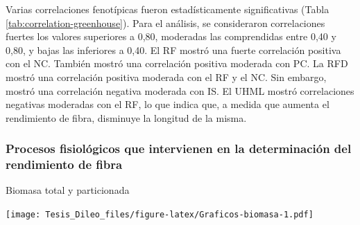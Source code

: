 \documentclass[12pt,oneside]{reedthesis}
\begin{document}
Varias correlaciones fenotípicas fueron estadísticamente significativas (Tabla \ref{tab:correlation-greenhouse}). Para el análisis, se consideraron correlaciones fuertes los valores superiores a 0,80, moderadas las comprendidas entre 0,40 y 0,80, y bajas las inferiores a 0,40. El RF mostró una fuerte correlación positiva con el NC. También mostró una correlación positiva moderada con PC. La RFD mostró una correlación positiva moderada con el RF y el NC. Sin embargo, mostró una correlación negativa moderada con IS. El UHML mostró correlaciones negativas moderadas con el RF, lo que indica que, a medida que aumenta el rendimiento de fibra, disminuye la longitud de la misma.

\subsubsection{Procesos fisiológicos que intervienen en la determinación del rendimiento de fibra}\label{procesos-fisioluxf3gicos-que-intervienen-en-la-determinaciuxf3n-del-rendimiento-de-fibra}

Biomasa total y particionada

\texttt{[image: Tesis\_Dileo\_files/figure-latex/Graficos-biomasa-1.pdf]}
\end{document}
